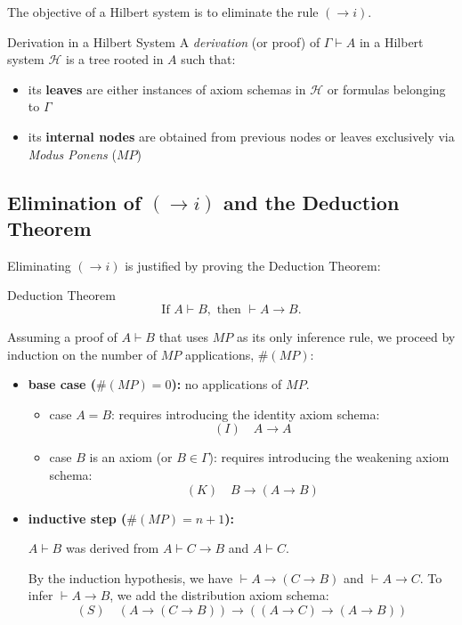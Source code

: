 \documentclass[a4paper, 11pt]{report}
\begin{document}
The objective of a Hilbert system is to eliminate the rule $(\to i)$.

\begin{defframe}{Derivation in a Hilbert System}{}
A \textit{derivation} (or proof) of $\Gamma \vdash A$ in a Hilbert system $\mathcal{H}$ is a tree rooted in $A$ such that:
\begin{itemize}
    \item its \textbf{leaves} are either instances of axiom schemas in $\mathcal{H}$ or formulas belonging to $\Gamma$
    \item its \textbf{internal nodes} are obtained from previous nodes or leaves exclusively via \textit{Modus Ponens} ($MP$)
\end{itemize}
\end{defframe}

\subsection{Elimination of $(\to i)$ and the Deduction Theorem}
Eliminating $(\to i)$ is justified by proving the Deduction Theorem:
\begin{thmframe}{Deduction Theorem}{}
    \vspace{-1em}
$$
    \text{If } A \vdash B, \text{ then } \vdash A \to B.
$$
\end{thmframe}
\begin{proofframe}{}{}
Assuming a proof of $A \vdash B$ that uses $MP$ as its only inference rule, we proceed by induction on the number of $MP$ applications, $\#(MP)$:

\begin{itemize}
    \item \textbf{base case ($\#(MP) = 0$):} no applications of $MP$.
    \begin{itemize}
        \item case $A = B$: requires introducing the identity axiom schema:
        \[
            (I) \quad A \to A
        \]
        \item case $B$ is an axiom (or $B \in \Gamma$): requires introducing the weakening axiom schema:
        \[
            (K) \quad B \to (A \to B)
        \]
    \end{itemize}

    \item \textbf{inductive step ($\#(MP) = n + 1$):}

        $A \vdash B$ was derived from $A \vdash C \to B$ and $A \vdash C$.


    By the induction hypothesis, we have $\vdash A \to (C \to B)$ and $\vdash A \to C$. To infer $\vdash A \to B$, we add the distribution axiom schema:
    \[
        (S) \quad (A \to (C \to B)) \to ((A \to C) \to (A \to B))
    \]
\end{itemize}
\end{proofframe}
\end{document}

